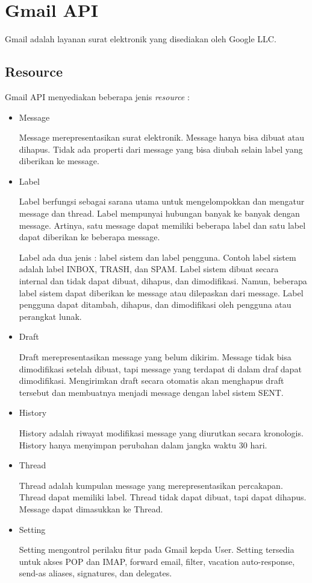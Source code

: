 \section{Gmail API ~\cite{gmail-api}}
\label{sec:gmail-api}
Gmail adalah layanan surat elektronik yang disediakan oleh Google LLC. 

\subsection{Resource}
Gmail API menyediakan beberapa jenis \textit{resource} :
\begin{itemize}
\item Message

Message merepresentasikan surat elektronik. Message hanya bisa dibuat atau dihapus. Tidak ada properti dari message yang bisa diubah selain label yang diberikan ke message.

\item Label

Label berfungsi sebagai sarana utama untuk mengelompokkan dan mengatur message dan thread. Label mempunyai hubungan banyak ke banyak dengan message. Artinya, satu message dapat memiliki beberapa label dan satu label dapat diberikan ke beberapa message.

Label ada dua jenis : label sistem dan label pengguna. Contoh label sistem adalah label INBOX, TRASH, dan SPAM. Label sistem dibuat secara internal dan tidak dapat dibuat, dihapus, dan dimodifikasi. Namun, beberapa label sistem dapat diberikan ke message atau dilepaskan dari message. Label pengguna dapat ditambah, dihapus, dan dimodifikasi oleh pengguna atau perangkat lunak.

\item Draft

Draft merepresentasikan message yang belum dikirim. Message tidak bisa dimodifikasi setelah dibuat, tapi message yang terdapat di dalam draf dapat dimodifikasi. Mengirimkan draft secara otomatis akan menghapus draft tersebut dan membuatnya menjadi message dengan label sistem SENT.

\item History

History adalah riwayat modifikasi message yang diurutkan secara kronologis. History hanya menyimpan perubahan dalam jangka waktu 30 hari.

\item Thread

Thread adalah kumpulan message yang merepresentasikan percakapan. Thread dapat memiliki label. Thread tidak dapat dibuat, tapi dapat dihapus. Message dapat dimasukkan ke Thread.

\item Setting

Setting mengontrol perilaku fitur pada Gmail kepda User. Setting tersedia untuk akses POP dan IMAP, forward email, filter, vacation auto-response, send-as aliases, signatures, dan delegates.

\end{itemize}  

